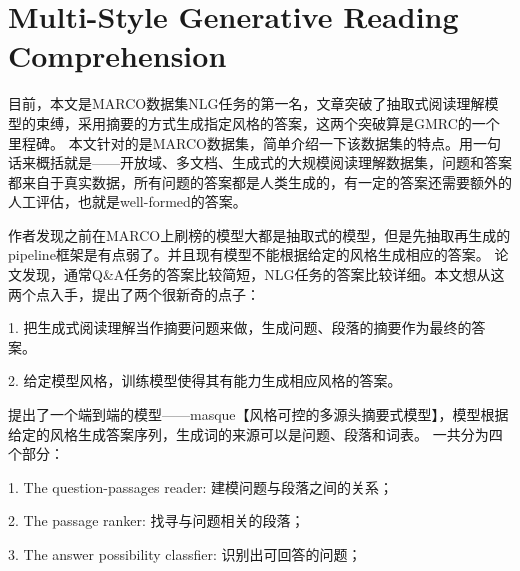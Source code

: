 \documentclass[a4paper,UTF8]{article}
\numberwithin{equation}{section}
\begin{document}
\newpage
\section{Multi-Style Generative Reading Comprehension}
目前，本文是MARCO数据集NLG任务的第一名，文章突破了抽取式阅读理解模型的束缚，采用摘要的方式生成指定风格的答案，这两个突破算是GMRC的一个里程碑。
本文针对的是MARCO数据集，简单介绍一下该数据集的特点。用一句话来概括就是——开放域、多文档、生成式的大规模阅读理解数据集，问题和答案都来自于真实数据，所有问题的答案都是人类生成的，有一定的答案还需要额外的人工评估，也就是well-formed的答案。

作者发现之前在MARCO上刷榜的模型大都是抽取式的模型，但是先抽取再生成的pipeline框架是有点弱了。并且现有模型不能根据给定的风格生成相应的答案。
论文发现，通常Q\&A任务的答案比较简短，NLG任务的答案比较详细。本文想从这两个点入手，提出了两个很新奇的点子：

1. 把生成式阅读理解当作摘要问题来做，生成问题、段落的摘要作为最终的答案。

2. 给定模型风格，训练模型使得其有能力生成相应风格的答案。

提出了一个端到端的模型——masque【风格可控的多源头摘要式模型】，模型根据给定的风格生成答案序列，生成词的来源可以是问题、段落和词表。
一共分为四个部分：

1. The question-passages reader: 建模问题与段落之间的关系；

2. The passage ranker: 找寻与问题相关的段落；

3. The answer possibility classfier: 识别出可回答的问题；
\end{document}
